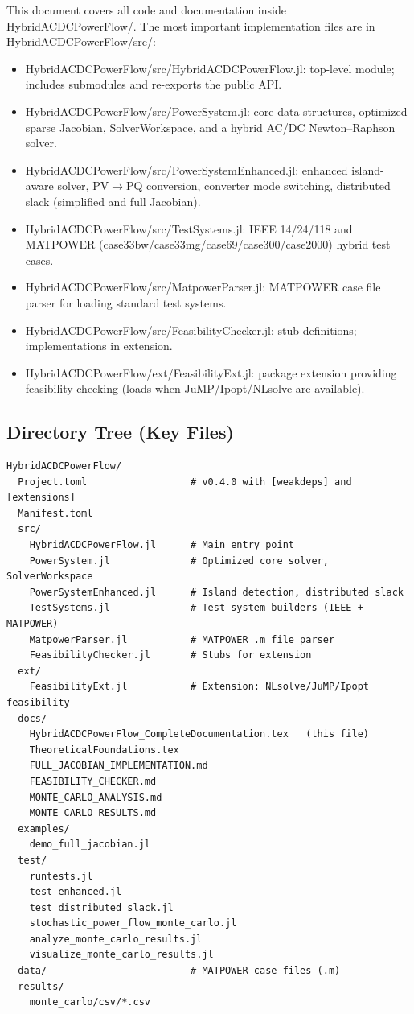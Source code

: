 \documentclass[11pt]{article}
\def\code#1{#1}%
\def\file#1{#1}%
\newcommand{\code}[1]{\nolinkurl{#1}}
\newcommand{\file}[1]{\path{#1}}
\begin{document}
This document covers all code and documentation inside \file{HybridACDCPowerFlow/}. The most important implementation files are in \file{HybridACDCPowerFlow/src/}:
\begin{itemize}[leftmargin=*]
  \item \file{HybridACDCPowerFlow/src/HybridACDCPowerFlow.jl}: top-level module; includes submodules and re-exports the public API.
  \item \file{HybridACDCPowerFlow/src/PowerSystem.jl}: core data structures, optimized sparse Jacobian, \code{SolverWorkspace}, and a hybrid AC/DC Newton--Raphson solver.
  \item \file{HybridACDCPowerFlow/src/PowerSystemEnhanced.jl}: enhanced island-aware solver, PV$\rightarrow$PQ conversion, converter mode switching, distributed slack (simplified and full Jacobian).
  \item \file{HybridACDCPowerFlow/src/TestSystems.jl}: IEEE 14/24/118 and MATPOWER (case33bw/case33mg/case69/case300/case2000) hybrid test cases.
  \item \file{HybridACDCPowerFlow/src/MatpowerParser.jl}: MATPOWER case file parser for loading standard test systems.
  \item \file{HybridACDCPowerFlow/src/FeasibilityChecker.jl}: stub definitions; implementations in extension.
  \item \file{HybridACDCPowerFlow/ext/FeasibilityExt.jl}: package extension providing feasibility checking (loads when JuMP/Ipopt/NLsolve are available).
\end{itemize}

\subsection{Directory Tree (Key Files)}
\begin{verbatim}
HybridACDCPowerFlow/
  Project.toml                  # v0.4.0 with [weakdeps] and [extensions]
  Manifest.toml
  src/
    HybridACDCPowerFlow.jl      # Main entry point
    PowerSystem.jl              # Optimized core solver, SolverWorkspace
    PowerSystemEnhanced.jl      # Island detection, distributed slack
    TestSystems.jl              # Test system builders (IEEE + MATPOWER)
    MatpowerParser.jl           # MATPOWER .m file parser
    FeasibilityChecker.jl       # Stubs for extension
  ext/
    FeasibilityExt.jl           # Extension: NLsolve/JuMP/Ipopt feasibility
  docs/
    HybridACDCPowerFlow_CompleteDocumentation.tex   (this file)
    TheoreticalFoundations.tex
    FULL_JACOBIAN_IMPLEMENTATION.md
    FEASIBILITY_CHECKER.md
    MONTE_CARLO_ANALYSIS.md
    MONTE_CARLO_RESULTS.md
  examples/
    demo_full_jacobian.jl
  test/
    runtests.jl
    test_enhanced.jl
    test_distributed_slack.jl
    stochastic_power_flow_monte_carlo.jl
    analyze_monte_carlo_results.jl
    visualize_monte_carlo_results.jl
  data/                         # MATPOWER case files (.m)
  results/
    monte_carlo/csv/*.csv
\end{verbatim}
\end{document}
